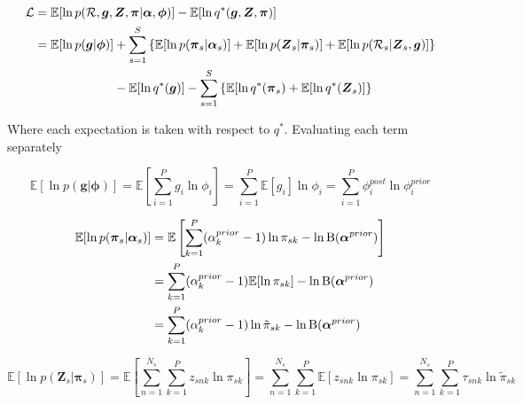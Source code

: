 \documentclass{article}
\begin{document}
\begin{align}
\label{eq:cnv_evidence}
\begin{split}
\mathcal{L} &= \mathbb{E}[\ln p(\mathcal{R}, \boldsymbol{g}, \boldsymbol{Z}, \boldsymbol{\pi} | \boldsymbol{\alpha}, \boldsymbol{\phi})] - \mathbb{E} [\ln q^*(\boldsymbol{g}, \boldsymbol{Z}, \boldsymbol{\pi})] \\
&= \mathbb{E}[\ln p(\boldsymbol{g} | \boldsymbol{\phi})] + \sum_{s = 1}^S \left\{ \mathbb{E}[\ln p(\boldsymbol{\pi}_s | \boldsymbol{\alpha}_s)] + \mathbb{E}[\ln p(\boldsymbol{Z}_s | \boldsymbol{\pi}_s)] + \mathbb{E}[\ln p(\mathcal{R}_s | \boldsymbol{Z}_s, \boldsymbol{g})] \right\} \notag \\
     &\phantom{{}=\mathbb{E}[\ln p(\boldsymbol{g} | \boldsymbol{\phi})] } - \mathbb{E}[\ln q^*(\boldsymbol{g})] - \sum_{s = 1}^S \left\{ \mathbb{E}[\ln q^*(\boldsymbol{\pi}_s) + \mathbb{E}[\ln q^*(\boldsymbol{Z}_s)] \right\}
\end{split}
\end{align}

Where each expectation is taken with respect to $q^*$. Evaluating each term separately

\begin{equation}
\mathbb{E}[\ln p(\boldsymbol{g} | \boldsymbol{\phi})] = \mathbb{E}\left[\sum_{i = 1}^P g_i \ln \phi_i\right] = \sum_{i = 1}^P \mathbb{E}[g_i] \ln \phi_i = \sum_{i = 1}^P \phi_i^{post} \ln \phi_i^{prior}
\end{equation}

\begin{align}
\mathbb{E}[\ln p(\boldsymbol{\pi}_s | \boldsymbol{\alpha}_s)] &= \mathbb{E}\left[\sum_{k = 1}^P (\alpha_k^{prior} - 1) \ln \pi_{sk} - \ln \text{B}(\boldsymbol{\alpha}^{prior})\right] \notag \\ 
&= \sum_{k = 1}^P (\alpha_k^{prior} - 1) \mathbb{E} [\ln \pi_{sk}] - \ln \text{B}(\boldsymbol{\alpha}^{prior}) \notag \\
 &= \sum_{k = 1}^P (\alpha_k^{prior} - 1) \ln \tilde{\pi}_{sk} - \ln \text{B}(\boldsymbol{\alpha}^{prior})
\end{align}

\begin{equation}
\mathbb{E}[\ln p(\boldsymbol{Z}_s | \boldsymbol{\pi}_s)] = \mathbb{E}\left[\sum_{n = 1}^{N_s} \sum_{k = 1}^P z_{snk} \ln \pi_{sk} \right] 
= \sum_{n = 1}^{N_s} \sum_{k = 1}^P \mathbb{E}[z_{snk} \ln \pi_{sk}]
= \sum_{n = 1}^{N_s} \sum_{k = 1}^P \tau_{snk} \ln \tilde{\pi}_{sk}
\end{equation}
\end{document}
